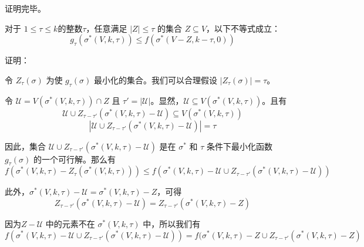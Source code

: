 \noindent 证明完毕。

\begin{lemma}
\label{lem:lem3}
对于 $1 \le \tau \le k$的整数$\tau$，任意满足 $|Z| \le \tau$ 的集合 $Z \subseteq V$，以下不等式成立：
\begin{equation}
g_\tau (\sigma^*(V,k,\tau)) \le f(\sigma^*(V-Z,k-\tau,0))
\end{equation}

\end{lemma}

\noindent 证明：

令 $Z_{\tau}(\sigma)$ 为使 $g_{\tau}(\sigma)$ 最小化的集合。我们可以合理假设 $|Z_{\tau}(\sigma)|=\tau$。

令 $\mathcal{U}=V(\sigma^*(V,k,\tau)) \cap Z$ 且 $\tau'=|\mathcal{U}|$。显然，$\mathcal{U}\subseteq V(\sigma^*(V,k,\tau))$。且有
\begin{equation}
\mathcal{U} \cup Z_{\tau-\tau'}(\sigma^*(V,k,\tau)-\mathcal{U}) \subseteq V(\sigma^*(V,k,\tau)) 
\end{equation}
\begin{equation}
|\mathcal{U} \cup Z_{\tau-\tau'}(\sigma^*(V,k,\tau)-\mathcal{U})| =\tau
\end{equation}

因此，集合 $\mathcal{U} \cup Z_{\tau-\tau'}(\sigma^*(V,k,\tau)-\mathcal{U})$ 是在 $\sigma^*$ 和 $\tau$ 条件下最小化函数 $g_\tau(\sigma)$ 的一个可行解。那么有
\begin{equation}
    f(\sigma^*(V,k,\tau) -Z_\tau(\sigma^*(V,k,\tau))) \le f(\sigma^*(V,k,\tau) - \mathcal{U} \cup Z_{\tau-\tau'}(\sigma^*(V,k,\tau)-\mathcal{U}))
\end{equation}

此外，$\sigma^*(V,k,\tau)-\mathcal{U} = \sigma^*(V,k,\tau) - Z$，可得
\begin{equation}
Z_{\tau-\tau'}(\sigma^*(V,k,\tau) - \mathcal{U}) = Z_{\tau-\tau'}(\sigma^*(V,k,\tau) - Z)
\end{equation}

因为$Z-\mathcal{U}$ 中的元素不在 $\sigma^*(V,k,\tau)$ 中，所以我们有
\begin{equation}
    f( \sigma^*(V,k,\tau) - \mathcal{U} \cup Z_{\tau-\tau'}(\sigma^*(V,k,\tau) - \mathcal{U}) ) = f( \sigma^*(V,k,\tau) - Z \cup Z_{\tau-\tau'}(\sigma^*(V,k,\tau) - Z)
\end{equation}

